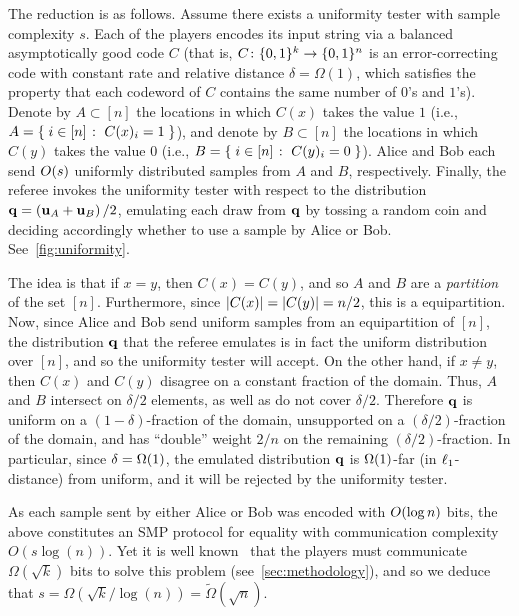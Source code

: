 The reduction is as follows. Assume there exists a uniformity tester with sample complexity $s$. Each of the players encodes its input string via a balanced asymptotically good code $C$ (that is, $C\colon\bitset^k \to \bitset^n$ is an error-correcting code with constant rate and relative distance $\delta = \Omega(1)$, which satisfies the property that each codeword of $C$ contains the same number of $0$'s and $1$'s). Denote by $A \subset [n]$ the locations in which $C(x)$ takes the value $1$ (i.e., $A = \setOfSuchThat{ i\in[n] }{ C(x)_i = 1 }$), and denote by $B \subset [n]$ the locations in which $C(y)$ takes the value $0$ (i.e., $B = \setOfSuchThat{ i\in[n] }{ C(y)_i = 0 }$). Alice and Bob each send $\bigO{s}$ uniformly distributed samples from $A$ and $B$, respectively. Finally, the referee invokes the uniformity tester with respect to the distribution $\q= \left( \uniform_{A}+ \uniform_{B} \right)/2$, emulating each draw from $\q$ by tossing a random coin and deciding accordingly whether to use a sample by Alice or Bob. See~\cref{fig:uniformity}.

The idea is that if $x=y$, then $C(x)=C(y)$, and so $A$ and $B$ are a \emph{partition} of the set $[n]$. Furthermore, since $\abs{C(x)} = \abs{C(y)} = n/2$, this is a equipartition. Now, since Alice and Bob send uniform samples from an equipartition of $[n]$, the distribution $\q$ that the referee emulates is in fact the uniform distribution over $[n]$, and so the uniformity tester will accept. On the other hand, if $x\neq y$, then $C(x)$ and $C(y)$ disagree on a constant fraction of the domain. Thus, $A$ and $B$ intersect on $\delta/2$ elements, as well as do not cover $\delta/2$. Therefore $\q$ is uniform on a $(1-\delta)$-fraction of the domain, unsupported on a $(\delta/2)$-fraction of the domain, and has ``double'' weight $2/n$ on the remaining $(\delta/2)$-fraction. In particular, since $\delta = \bigOmega{1}$, the emulated distribution $\q$ is $\bigOmega{1}$-far (in $\lp[1]$-distance) from uniform, and it will be rejected by the uniformity tester.

As each sample sent by either Alice or Bob was encoded with $\bigO{\log n}$ bits, the above constitutes an SMP protocol for equality with communication complexity $O(s \log(n))$.  Yet it is well known~\cite{newman1996public} that the players must communicate $\Omega(\sqrt{k})$ bits to solve this problem (see~\cref{sec:methodology}), and so we deduce that $s = \Omega(\sqrt{k}/\log(n)) = \tilde\Omega(\sqrt{n})$.

